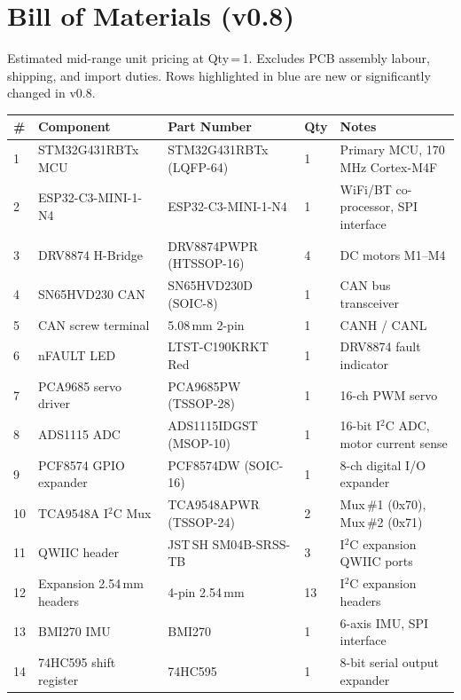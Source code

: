 \documentclass[11pt,a4paper]{article}
\begin{document}
\section{Bill of Materials (v0.8)}

Estimated mid-range unit pricing at Qty\,=\,1. Excludes PCB assembly labour, shipping, and import duties. Rows highlighted in blue are new or significantly changed in v0.8.

\begin{longtable}{p{0.5cm} p{4.5cm} p{3.5cm} p{0.8cm} p{5.5cm}}
  \toprule
  \rowcolor{headergray}\color{white}\textbf{\#} &
  \color{white}\textbf{Component} &
  \color{white}\textbf{Part Number} &
  \color{white}\textbf{Qty} &
  \color{white}\textbf{Notes} \\
  \midrule\endhead
  \rowcolor{newrow}1 & STM32G431RBTx MCU & STM32G431RBTx (LQFP-64) & 1 & Primary MCU, 170\,MHz Cortex-M4F \\
  \rowcolor{newrow}2 & ESP32-C3-MINI-1-N4 & ESP32-C3-MINI-1-N4 & 1 & WiFi/BT co-processor, SPI interface \\
  3 & DRV8874 H-Bridge & DRV8874PWPR (HTSSOP-16) & 4 & DC motors M1--M4 \\
  4 & SN65HVD230 CAN & SN65HVD230D (SOIC-8) & 1 & CAN bus transceiver \\
  5 & CAN screw terminal & 5.08\,mm 2-pin & 1 & CANH / CANL \\
  6 & nFAULT LED & LTST-C190KRKT Red & 1 & DRV8874 fault indicator \\
  7 & PCA9685 servo driver & PCA9685PW (TSSOP-28) & 1 & 16-ch PWM servo \\
  8 & ADS1115 ADC & ADS1115IDGST (MSOP-10) & 1 & 16-bit I$^2$C ADC, motor current sense \\
  9 & PCF8574 GPIO expander & PCF8574DW (SOIC-16) & 1 & 8-ch digital I/O expander \\
  10 & TCA9548A I$^2$C Mux & TCA9548APWR (TSSOP-24) & 2 & Mux\,\#1 (0x70), Mux\,\#2 (0x71) \\
  11 & QWIIC header & JST\,SH SM04B-SRSS-TB & 3 & I$^2$C expansion QWIIC ports \\
  12 & Expansion 2.54\,mm headers & 4-pin 2.54\,mm & 13 & I$^2$C expansion headers \\
  \rowcolor{newrow}13 & BMI270 IMU & BMI270 & 1 & 6-axis IMU, SPI interface \\
  \rowcolor{newrow}14 & 74HC595 shift register & 74HC595 & 1 & 8-bit serial output expander \\

\end{longtable}
\end{document}
